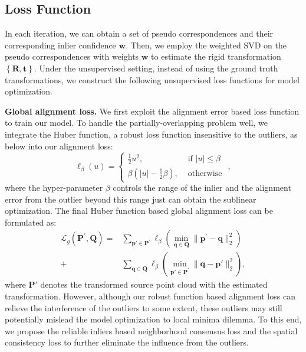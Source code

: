 \documentclass[letterpaper]{article} %
\begin{document}
	\subsection{Loss Function}\label{loss1}
	In each iteration, we can obtain a set of pseudo correspondences and their corresponding inlier confidence $\mathbf{w}$. Then, we employ the weighted SVD on the pseudo correspondences with weights $\mathbf{w}$ to estimate the rigid transformation $\left\{\mathbf{R},\mathbf{t}\right\}$. Under the unsupervised setting, instead of using the ground truth transformations, we construct the following unsupervised loss functions for model optimization.
	
	\noindent \textbf{Global alignment loss.} 
	We first exploit the alignment error based loss function to train our model. To handle the partially-overlapping problem well, we integrate the Huber function, a robust loss function insensitive to the outliers, as below into our alignment loss: 
	\begin{equation}\label{huber}
	\ell_{\beta}(u)= \begin{cases}\frac{1}{2} u^{2}, & \text { if }|u| \leq \beta \\ \beta\left(|u|-\frac{1}{2} \beta\right), & \text { otherwise }\end{cases},
	\end{equation}
	where the hyper-parameter $\beta$ controls the range of the inlier and the alignment error from the outlier beyond this range just can obtain the sublinear optimization. 
	The final Huber function based global alignment loss can be formulated as:
	\begin{equation}
	\begin{split}
	\mathcal{L}_g\left(\mathbf{P}^{\prime}, \mathbf{Q}\right) =&\sum_{\mathbf{p}' \in \mathbf{P}^{\prime}} \ell_{\beta}\left(\min _{\mathbf{q} \in \mathbf{Q}}\|\mathbf{p}^{\prime}-\mathbf{q}\|_{2}^{2}\right) \\
	+&\sum_{\mathbf{q} \in \mathbf{Q}} \ell_{\beta}\left(\min _{\mathbf{p}' \in \mathbf{P}^{\prime}}\|\mathbf{q}-\mathbf{p}'\|_{2}^{2}\right),
	\end{split}
	\end{equation}
	where $\mathbf{P}'$ denotes the transformed source point cloud with the estimated transformation. 
	However, although our robust function based alignment loss can relieve the interference of the outliers to some extent, these outliers may still potentially mislead the model optimization to local minima dilemma. To this end, we propose the reliable inliers based neighborhood consensus loss and the spatial consistency loss to further eliminate the influence from the outliers.
	
\end{document}
